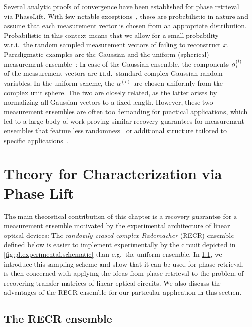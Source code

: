 Several analytic proofs of convergence have been established for phase retrieval via PhaseLift.
With few notable exceptions~\cite{Kech_2016_Explicit}, these are probabilistic in nature and assume that each measurement vector is chosen from an appropriate distribution.
Probabilistic in this context means that we allow for a small probability w.r.t.\ the random sampled measurement vectors of failing to reconstruct $x$.
Paradigmatic examples are the Gaussian and the uniform (spherical) measurement ensemble~\cite{Candes_2013_Phaselift}:
In case of the Gaussian ensemble, the components $\alpha^{(l)}_i$ of the measurement vectors are i.i.d.\ standard complex Gaussian random variables.
In the uniform scheme, the $\alpha^{(l)}$ are chosen uniformly from the complex unit sphere.
The two are closely related, as the latter arises by normalizing all Gaussian vectors to a fixed length.
However, these two measurement ensembles are often too demanding for practical applications, which led to a large body of work proving similar recovery guarantees  for measurement ensembles that feature less randomness~\cite{Gross_2014_Partial,Kueng_2014_Low,Kueng_2014_Low,Kueng_2016_Low} or additional structure tailored to specific applications~\cite{Candes_2013_Phaselift,Gross_2017_Improved,Voroninski_2013_Quantum,Kueng_2015_Low}.


\section{Theory for Characterization via Phase Lift}%
\label{sec:pl.theory}

The main theoretical contribution of this chapter is a recovery guarantee for a measurement ensemble motivated by the experimental architecture of linear optical devices:
The \emph{randomly erased complex Rademacher} (RECR) ensemble defined below is easier to implement experimentally by the circuit depicted in \cref{fig:pl.experimental.schematic} than e.g.\ the uniform ensemble.
In \cref{sub:pl.recr}, we introduce this sampling scheme and show that it can be used for phase retrieval.
 is then concerned with applying the ideas from phase retrieval to the problem of recovering transfer matrices of linear optical circuits.
We also discuss the advantages of the RECR ensemble for our particular application in this section.


\subsection{The RECR ensemble}%
\label{sub:pl.recr}

